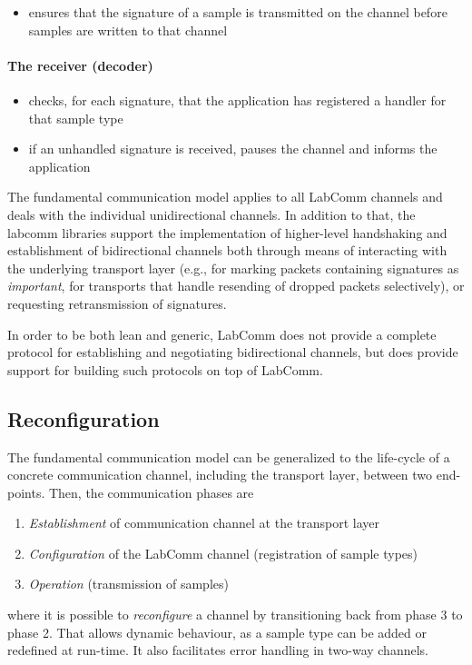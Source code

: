 \documentclass[a4paper]{article}
\begin{document}
\begin{itemize}
 \item ensures that the signature of a sample is transmitted on the channel before samples are
       written to that channel
\end{itemize}

\paragraph{The receiver (decoder)}

\begin{itemize}
 \item checks, for each signature, that the application has registered a handler for that sample type
 \item if an unhandled signature is received, pauses the channel and informs the application
\end{itemize}

The fundamental communication model applies to all LabComm channels and
deals with the individual unidirectional channels. In addition to that,
the labcomm libraries support the implementation of higher-level
handshaking and establishment of bidirectional channels both through
means of interacting with the underlying transport layer (e.g., for
marking packets containing signatures as \emph{important}, for
transports that handle resending of dropped packets selectively), or
requesting retransmission of signatures.

In order to be both lean and generic, LabComm does not provide a
complete protocol for establishing and negotiating bidirectional
channels, but does provide support for building such protocols on top
of LabComm.
\subsection{Reconfiguration}
\label{sec:reconfig}

The fundamental communication model can be generalized to the life-cycle
of a concrete communication channel, including the transport layer,
between two end-points. Then, the communication phases are
\begin{enumerate}
  \item \emph{Establishment} of communication channel at the transport layer
  \item \emph{Configuration} of the LabComm channel (registration of sample
    types)
  \item \emph{Operation} (transmission of samples)
\end{enumerate}
where it is possible to \emph{reconfigure} a channel by transitioning
back from phase 3 to phase 2. That allows dynamic behaviour, as a sample
type can be added or redefined at run-time. It also facilitates error
handling in two-way channels.
\end{document}
